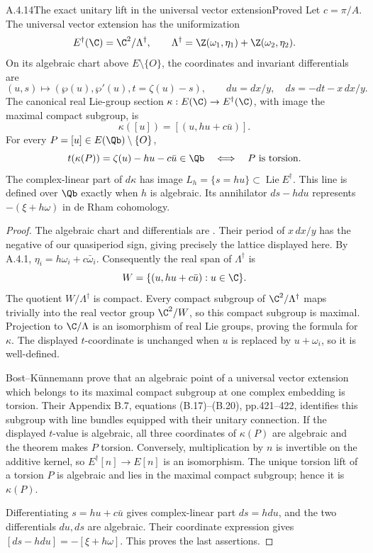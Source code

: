 \begin{result}{A.4.14}{The exact unitary lift in the universal vector extension}{Proved}
Let $c=\pi/A$. The universal vector extension has the uniformization
\[
 E^\dagger(\C)=\C^2/\Lambda^\dagger,\qquad
 \Lambda^\dagger=\Z(\omega_1,\eta_1)+\Z(\omega_2,\eta_2).
\]
On its algebraic chart above $E\setminus\{O\}$, the coordinates and invariant differentials are
\[
 (u,s)\longmapsto(\wp(u),\wp'(u),t=\zeta(u)-s),\qquad
 du=dx/y,\quad ds=-dt-x\,dx/y.
\]
The canonical real Lie-group section $\kappa:E(\C)\to E^\dagger(\C)$, with image the maximal compact subgroup, is
\[
 \kappa([u])=[(u,hu+c\bar u)].
\]
For every $P=[u]\in E(\Qb)\setminus\{O\}$,
\[
 t(\kappa(P))=\zeta(u)-hu-c\bar u\in\Qb
 \quad\Longleftrightarrow\quad P\text{ is torsion}.
\]
The complex-linear part of $d\kappa$ has image $L_h=\{s=hu\}\subset\operatorname{Lie}E^\dagger$. This line is defined over $\Qb$ exactly when $h$ is algebraic. Its annihilator $ds-hdu$ represents $-(\xi+h\omega)$ in de Rham cohomology.
\end{result}
\begin{proof}
The algebraic chart and differentials are \cite[Sections 4.1--4.2, equation (4.1) and Proposition 4.2, pp.7--8]{EllFonsecaMatthes2020}. Their period of $x\,dx/y$ has the negative of our quasiperiod sign, giving precisely the lattice displayed here. By A.4.1,
$\eta_i=h\omega_i+c\bar\omega_i$. Consequently the real span of $\Lambda^\dagger$ is
\[
 W=\{(u,hu+c\bar u):u\in\C\}.
\]
The quotient $W/\Lambda^\dagger$ is compact. Every compact subgroup of $\C^2/\Lambda^\dagger$ maps trivially into the real vector group $\C^2/W$, so this compact subgroup is maximal. Projection to $\C/\Lambda$ is an isomorphism of real Lie groups, proving the formula for $\kappa$. The displayed $t$-coordinate is unchanged when $u$ is replaced by $u+\omega_i$, so it is well-defined.

Bost--K\"unnemann \cite[Theorem 3.1.2, p.386]{EllBostKunnemann2009} prove that an algebraic point of a universal vector extension which belongs to its maximal compact subgroup at one complex embedding is torsion. Their Appendix B.7, equations (B.17)--(B.20), pp.421--422, identifies this subgroup with line bundles equipped with their unitary connection. If the displayed $t$-value is algebraic, all three coordinates of $\kappa(P)$ are algebraic and the theorem makes $P$ torsion. Conversely, multiplication by $n$ is invertible on the additive kernel, so $E^\dagger[n]\to E[n]$ is an isomorphism. The unique torsion lift of a torsion $P$ is algebraic and lies in the maximal compact subgroup; hence it is $\kappa(P)$.

Differentiating $s=hu+c\bar u$ gives complex-linear part $ds=hdu$, and the two differentials $du,ds$ are algebraic. Their coordinate expression gives $[ds-hdu]=-[\xi+h\omega]$. This proves the last assertions.
\end{proof}

